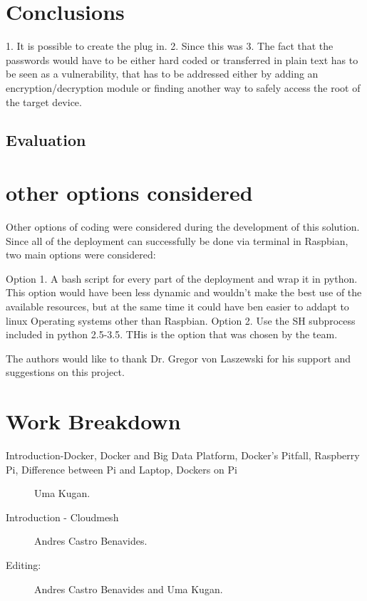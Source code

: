 \documentclass[sigconf]{acmart}
\begin{document}
	
	
	
	\section{Conclusions}
	
	1. It is possible to create the plug in.
	2. Since this was 
	3. The fact that the passwords would have to be either hard coded or transferred in plain text has to be seen as a vulnerability, that has to be addressed either by adding an encryption/decryption module or finding another way to safely access the root of the target device.
	
	\subsection{Evaluation}
	
	
	\section{other options considered}

	Other options of coding were considered during the development of this solution. 	Since all of the deployment can successfully be done via terminal in Raspbian, two main options were considered:
	
	Option 1. A bash script for every part of the deployment and wrap it in python. This option would have been less dynamic and wouldn't make the best use of the available resources, but at the same time it could have ben easier to addapt to linux Operating systems other than Raspbian.
	Option 2. Use the SH subprocess included in python 2.5-3.5. THis is the option that was chosen by the team.
	
	
	\begin{acks}
		The authors would like to thank Dr. Gregor von Laszewski for his support and suggestions on this project.
	\end{acks}
	
	
	
	
	\newpage
	
	\appendix
	
	\section{Work Breakdown}
	
	\begin{description}
		
		\item[Introduction-Docker, Docker and Big Data Platform, Docker's Pitfall, Raspberry Pi, Difference between Pi and Laptop, Dockers on Pi] Uma Kugan.
		\item[Introduction - Cloudmesh] Andres Castro Benavides.
		
		\item[Editing:] Andres Castro Benavides and Uma Kugan.
		
	\end{description}
	
\end{document}
